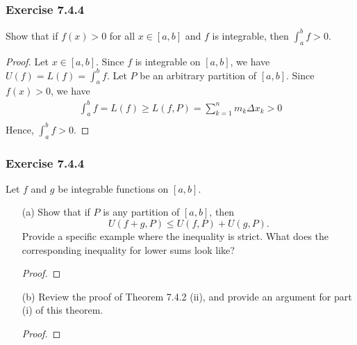 \subsubsection{Exercise 7.4.4} Show that if \( f(x) > 0  \) for all \( x \in [a,b]  \) and \( f  \) is integrable, then \( \int_{ a }^{ b } f > 0 . \)
\begin{proof}
	Let \( x \in [a,b]  \). Since \( f \) is integrable on \( [a,b]  \), we have \( U(f) = L(f) = \int_{ a }^{ b } f   \). Let \( P \) be an arbitrary partition of \( [a,b]  \). Since \( f(x) > 0  \), we have
	\begin{align*}
		\int_{ a }^{ b } f = L(f) \geq L(f, P)  
								  = \sum_{ k=1 }^{ n } m_{k } \Delta x_{k }  > 0 \\
	\end{align*}
	Hence, \( \int_{ a }^{ b } f > 0  \).
\end{proof}

\subsubsection{Exercise 7.4.4} Let \( f  \) and \( g  \) be integrable functions on \( [a,b] \). 
\begin{enumerate}
	\item[(a)] Show that if \( P  \) is any partition of \( [a,b]  \), then 
		\[  U(f+g, P ) \leq U(f,P) + U(g,P). \]
		Provide a specific example where the inequality is strict. What does the corresponding inequality for lower sums look like? 
		\begin{proof}
		
		\end{proof}
	\item[(b)] Review the proof of Theorem 7.4.2 (ii), and provide an argument for part (i) of this theorem.
		\begin{proof}
		
		\end{proof}
\end{enumerate}



